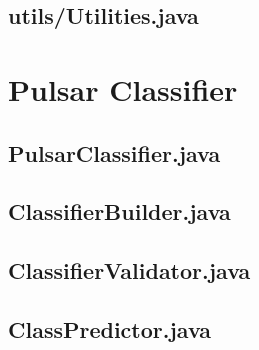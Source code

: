 \documentclass{article}
\begin{document}
\begin{appendices}
\begin{subappendices}
        \pagebreak
        \subsection{utils/Utilities.java}
        

    \end{subappendices}
    
    \pagebreak
    \section{Pulsar Classifier}
    \begin{subappendices}
        \label{src:pulsarclassifier}
        \subsection{PulsarClassifier.java}
        

        \pagebreak
        \subsection{ClassifierBuilder.java}
        

        \pagebreak
        \subsection{ClassifierValidator.java}
        

        \pagebreak
        \subsection{ClassPredictor.java}
        


\end{subappendices}
\end{appendices}
\end{document}
